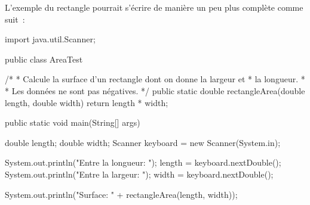 			L'exemple du rectangle pourrait s'écrire de manière un peu plus 
			complète comme suit~:

			\begin{java}
import java.util.Scanner;
				
public class AreaTest {
	/* 
	 * Calcule la surface d'un rectangle dont on donne la largeur et 
	 * la longueur.
	 * 
	 * Les données ne sont pas négatives.
	 */
	public static double rectangleArea(double length, double width){
		return length * width;
	}

	public static void main(String[] args){
		double length;
		double width;
		Scanner keyboard = new Scanner(System.in);

		System.out.println("Entre la longueur: ");
		length = keyboard.nextDouble();
		System.out.println("Entre la largeur: ");
		width = keyboard.nextDouble();

		System.out.println("Surface: " + rectangleArea(length, width));
	}
}

			\end{java}
